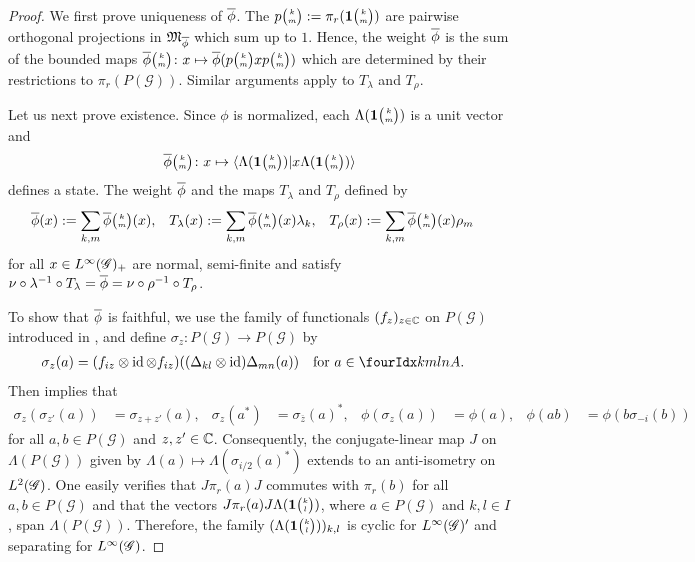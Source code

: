 \begin{proof}
  We first prove uniqueness of $\overline{\phi}$.  The
  $p{\tiny {\begin{pmatrix} k\\m\end{pmatrix}}}:=\pi_{r}(\mathbf{1}{\tiny {\begin{pmatrix} k\\m\end{pmatrix}}})$ are pairwise orthogonal
  projections in $\mathfrak{M}_{\overline{\phi}}$ which sum up to $1$. Hence, the
  weight $\overline{\phi}$ is the sum of the bounded maps
  $\overline{\phi}{\tiny {\begin{pmatrix} k\\m\end{pmatrix}}} \colon x \mapsto
  \overline{\phi}(p{\tiny {\begin{pmatrix} k\\m\end{pmatrix}}}xp{\tiny {\begin{pmatrix} k\\m\end{pmatrix}}})$ which are determined
  by their restrictions to $\pi_{r}(P(\mathscr{G}))$. Similar
  arguments apply to $T_{\lambda}$ and $T_{\rho}$.

Let us next prove existence.  Since $\phi$ is normalized,   each
$\Lambda(\mathbf{1}{\tiny {\begin{pmatrix} k\\m\end{pmatrix}}})$ is a unit vector and
\begin{align*}
  \overline{\phi}{\tiny {\begin{pmatrix} k\\m\end{pmatrix}}} \colon x \mapsto \langle \Lambda(\mathbf{1}{\tiny {\begin{pmatrix} k\\m\end{pmatrix}}})|x \Lambda(\mathbf{1}{\tiny {\begin{pmatrix} k\\m\end{pmatrix}}})\rangle
\end{align*}
defines a state. The weight $\overline{\phi}$ and the maps $T_{\lambda}$ and $T_{\rho}$
defined by
\begin{align} \label{eq:vn-weights}
  \overline{\phi}(x) &:= \sum_{k,m} \overline{\phi}{\tiny {\begin{pmatrix} k\\m\end{pmatrix}}}(x), &
    T_{\lambda}(x)&:= \sum_{k,m}
\overline{\phi}{\tiny {\begin{pmatrix} k\\m\end{pmatrix}}}(x)\lambda_{k}, & 
T_{\rho}(x)&:=
    \sum_{k,m} \overline{\phi}{\tiny {\begin{pmatrix} k\\m\end{pmatrix}}}(x)\rho_{m}
\end{align}
for all $x\in L^{\infty}(\mathscr{G})_{+}$  are normal, semi-finite and satisfy $\nu
\circ \lambda^{-1} \circ T_{\lambda} = \overline{\phi} = \nu \circ \rho^{-1}
\circ T_{\rho}$.

To  show that $\overline{\phi}$ is faithful, we
use the family of functionals $(f_{z})_{z \in \mathbb{C}}$ on $P(\mathscr{G})$
introduced in \cite[Theorem 3.49]{DCT1}, and define 
$\sigma_{z} \colon P(\mathscr{G}) \to P(\mathscr{G})$
by
\begin{align*}
\sigma_{z}(a) &= (f_{iz} \otimes \id \otimes f_{iz})((\Delta_{kl}
\otimes \id)\Delta_{mn}(a)) \quad \text{for } a\in \Gr{A}{k}{l}{m}{n}.
\end{align*}
Then \cite[Theorem 3.49]{DCT1} implies that
\begin{align} \label{eq:alg-mod-aut}
 \sigma_{z}(\sigma_{z'}(a)) &= \sigma_{z+z'}(a), &
 \sigma_{z}(a^{*}) &= \sigma_{\overline{z}}(a)^{*}, &
\phi(\sigma_{z}(a)) &= \phi(a), & \phi(ab) &= \phi(b\sigma_{-i}(b))
\end{align}
for all $a,b\in P(\mathscr{G})$ and $z,z'\in \mathbb{C}$. Consequently, the conjugate-linear
  map $J$ on $\Lambda(P(\mathscr{G}))$ given by $\Lambda(a) \mapsto
  \Lambda(\sigma_{i/2}(a)^{*})$ extends to an anti-isometry on
  $L^{2}(\mathscr{G})$.  One easily verifies that $J\pi_{r}(a)J$ commutes with
  $\pi_{r}(b)$ for all $a,b\in P(\mathscr{G})$  and that the vectors
  $J\pi_{r}(a)J \Lambda(\mathbf{1}{\tiny {\begin{pmatrix} k\\l\end{pmatrix}}})$, where $a\in P(\mathscr{G})$
  and $k,l\in I$, span $\Lambda(P(\mathscr{G}))$. Therefore, the
  family $(\Lambda(\mathbf{1}{\tiny {\begin{pmatrix} k\\l\end{pmatrix}}}))_{k,l}$ is cyclic for $L^{\infty}(\mathscr{G})'$ and
 separating for $L^{\infty}(\mathscr{G})$. 



\end{proof}
